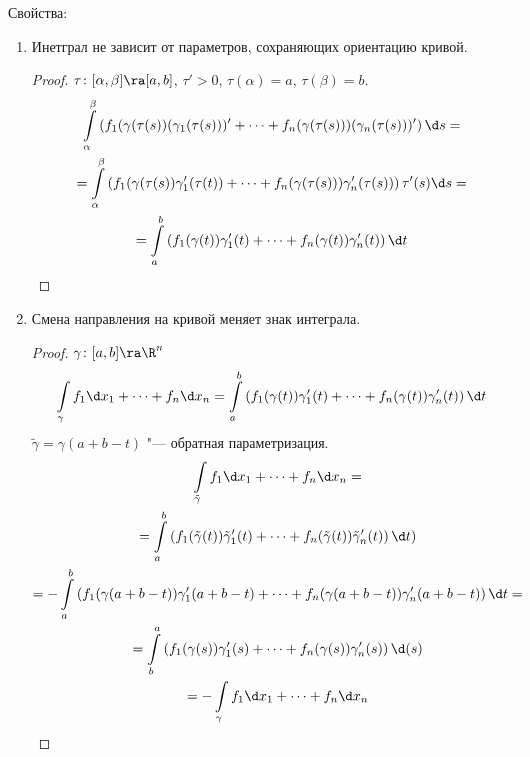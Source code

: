Свойства:
\begin{enumerate}
\item
	Инетграл не зависит от параметров, сохраняющих ориентацию кривой.
	\begin{proof}
		$\tau\colon [\alpha, \beta] \ra [a, b]$, $\tau' > 0$, $\tau(\alpha) = a$, $\tau(\beta) = b$.
		\begin{gather*}
			\int\limits_\alpha^\beta \left(f_1(\gamma(\tau(s))(\gamma_1(\tau(s)))' + \dots + f_n(\gamma(\tau (s)))(\gamma_n(\tau(s)))' \right) \d s =\\
			= \int\limits_\alpha^\beta \left(f_1(\gamma(\tau(s))\gamma'_1(\tau (t) ) + \dots + f_n(\gamma(\tau (s) ))\gamma'_n(\tau(s)) \right) \tau'(s) \d s = \\
			= \int\limits_a^b \left(f_1(\gamma(t))\gamma'_1(t) + \dots + f_n(\gamma(t))\gamma'_n(t) \right) \d t
		\end{gather*}
	\end{proof}

\item
	Смена направления на кривой меняет знак интеграла.
	\begin{proof}
		$\gamma\colon [a, b] \ra \R^n$
		\[
			\int\limits_\gamma f_1 \d x_1 + \dots + f_n \d x_n
			= \int\limits_a^b \left(f_1(\gamma(t))\gamma'_1(t) + \dots + f_n(\gamma(t))\gamma'_n(t) \right) \d t
		\]
		$\tilde\gamma = \gamma(a+b-t)$ "--- обратная параметризация.
		\begin{gather*}
			\int\limits_{\tilde\gamma} f_1 \d x_1 + \dots + f_n \d x_n = \\
			= \int\limits_a^b \left(f_1(\tilde \gamma(t))\tilde \gamma'_1(t) + \cdots + f_n(\tilde \gamma(t))\tilde \gamma'_n(t) \right)\d t) \\
			= -\int\limits_a^b \left(f_1(\gamma(a+b-t))\gamma'_1(a+b-t) + \dots + f_n(\gamma(a+b-t))\gamma'_n(a+b-t) \right) \d t = \\
			= \int\limits_b^a \left(f_1(\gamma(s))\gamma'_1(s) + \dots + f_n(\gamma(s))\gamma'_n(s) \right) \d (s)\\
			= -\int\limits_\gamma f_1 \d x_1 + \dots + f_n \d x_n
		\end{gather*}
	\end{proof}


\end{enumerate}
